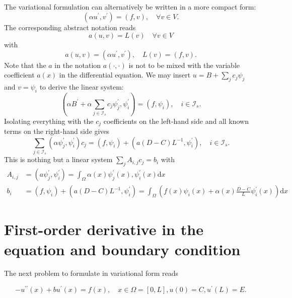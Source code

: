 \documentclass[../main.tex]{subfiles}
\begin{document}
		The variational formulation can alternatively be written in a more compact form:
		$$
		\left(\alpha u^{\prime}, v^{\prime}\right)=(f, v), \quad \forall v \in V .
		$$
		The corresponding abstract notation reads
		$$
		a(u, v)=L(v) \quad \forall v \in V
		$$
		with
		$$
		a(u, v)=\left(\alpha u^{\prime}, v^{\prime}\right), \quad L(v)=(f, v) .
		$$
		Note that the $a$ in the notation $a(\cdot, \cdot)$ is not to be mixed with the variable coefficient $a(x)$ in the differential equation.\smallbreak
		We may insert $u=B+\sum_{j} c_{j} \psi_{j}$ and $v=\psi_{i}$ to derive the linear system:
		$$\left(\alpha B^{\prime}+\alpha \sum_{j \in \mathcal{I}_{s}} c_{j} \psi_{j}^{\prime}, \psi_{i}^{\prime}\right)=\left(f, \psi_{i}\right), \quad i \in \mathcal{I}_{s} .$$
		Isolating everything with the $c_{j}$ coefficients on the left-hand side and all known terms on the right-hand side gives
		$$\sum_{j \in \mathcal{I}_{s}}\left(\alpha \psi_{j}^{\prime}, \psi_{i}^{\prime}\right) c_{j}=\left(f, \psi_{i}\right)+\left(a(D-C) L^{-1}, \psi_{i}^{\prime}\right), \quad i \in \mathcal{I}_{s} .$$
		This is nothing but a linear system $\sum_{j} A_{i, j} c_{j}=b_{i}$ with
		$$
		\begin{aligned}
			A_{i, j} &=\left(a \psi_{j}^{\prime}, \psi_{i}^{\prime}\right)=\int_{\Omega} \alpha(x) \psi_{j}^{\prime}(x), \psi_{i}^{\prime}(x) \mathrm{d} x \\
			b_{i} &=\left(f, \psi_{i}\right)+\left(a(D-C) L^{-1}, \psi_{i}^{\prime}\right)=\int_{\Omega}\left(f(x) \psi_{i}(x)+\alpha(x) \frac{D-C}{L} \psi_{i}^{\prime}(x)\right) \mathrm{d} x
		\end{aligned}
		$$\bigbreak
	\section[First-order derivative in the equation and boundary condition]{First-order derivative in the equation and boundary condition}
		\label{sec:sec_12_2}
		\noindent The next problem to formulate in variational form reads
		
		\begin{equation}
		\label{eqa167}
			-u^{\prime \prime}(x)+b u^{\prime}(x)=f(x), \quad x \in \Omega=[0, L], u(0)=C, u^{\prime}(L)=E .
		\end{equation}
	
\end{document}
